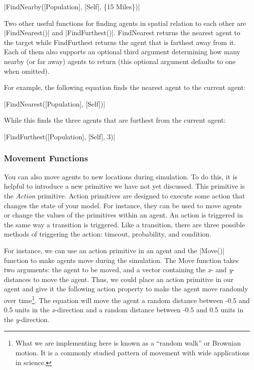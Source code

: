 \documentclass[]{memoir}
\newcommand{\DecValTok}[1]{\textcolor[rgb]{0.25,0.63,0.44}{{#1}}}
\newcommand{\FunctionTok}[1]{\textcolor[rgb]{0.02,0.16,0.49}{{#1}}}
\newcommand{\NormalTok}[1]{{#1}}
\begin{document}
|\FunctionTok{FindNearby}\NormalTok{([Population], [Self], \{}\DecValTok{15} \NormalTok{Miles\})}|

Two other useful functions for finding agents in spatial relation to
each other are |\FunctionTok{FindNearest}\NormalTok{()}| and
|\FunctionTok{FindFurthest}\NormalTok{()}|. FindNearest returns the
nearest agent to the target while FindFurthest returns the agent that is
farthest away from it. Each of them also supports an optional third
argument determining how many nearby (or far away) agents to return
(this optional argument defaults to one when omitted).

For example, the following equation finds the nearest agent to the
current agent:

|\FunctionTok{FindNearest}\NormalTok{([Population], [Self])}|

While this finds the three agents that are furthest from the current
agent:

|\FunctionTok{FindFurthest}\NormalTok{([Population], [Self], }\DecValTok{3}\NormalTok{)}|

\subsubsection{Movement Functions}

You can also move agents to new locations during simulation. To do this,
it is helpful to introduce a new primitive we have not yet discussed.
This primitive is the \emph{Action} primitive. Action primitives are
designed to execute some action that changes the state of your model.
For instance, they can be used to move agents or change the values of
the primitives within an agent. An action is triggered in the same way a
transition is triggered. Like a transition, there are three possible
methods of triggering the action: timeout, probability, and condition.

For instance, we can use an action primitive in an agent and the
|\FunctionTok{Move}\NormalTok{()}| function to make agents move during
the simulation. The Move function takes two arguments: the agent to be
moved, and a vector containing the \emph{x}- and \emph{y}-distances to
move the agent. Thus, we could place an action primitive in our agent
and give it the following action property to make the agent move
randomly over time\footnote{What we are implementing here is known as a
  ``random walk'' or Brownian motion. It is a commonly studied pattern
  of movement with wide applications in science.}. The equation will
move the agent a random distance between -0.5 and 0.5 units in the
\emph{x}-direction and a random distance between -0.5 and 0.5 units in
the \emph{y}-direction.
\end{document}
